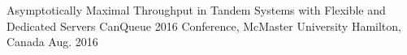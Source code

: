 
\begin{cventries}

	\cventry
	{Asymptotically Maximal Throughput in Tandem Systems with Flexible and Dedicated Servers} %
	{CanQueue 2016 Conference, McMaster University} %
	{Hamilton, Canada} %
	{Aug. 2016} %
	{}
\end{cventries}
